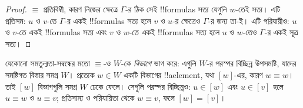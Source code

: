 \documentclass[../../../include/open-logic-section]{subfiles}
\begin{document}
\begin{proof}
  $\equiv$ প্রতিবিম্বী, কারণ নিজের ক্ষেত্রে $\Gamma$-র ঠিক সেই !!{formula}s সত্য যেগুলি $w$-তেই সত্য। এটি প্রতিসম: $u$ ও $v$-তে $\Gamma$-র একই !!{formula}s সত্য হলে $v$ ও $u$-র ক্ষেত্রেও $\Gamma$-র জন্য তা-ই। এটি পরিযায়ীও: $u$ ও $v$-তে একই !!{formula}s সত্য এবং $v$ ও $w$-তে একই !!{formula}s সত্য হলে $u$ ও $w$-তেও $\Gamma$-র একই সূত্র সত্য।
\end{proof}

যেকোনো সমতুল্যতা-সম্বন্ধের মতো $\equiv$-ও $W$-কে \emph{বিভাগে} ভাগ করে: এগুলি $W$-র পরস্পর বিচ্ছিন্ন উপসমষ্টি, যাদের সমষ্টিগত বিস্তার সমগ্র $W$। প্রত্যেক $w \in W$ একটি বিভাগের !!a{element}, যথা $[w]$-এর, কারণ $w \equiv w$। তাই $[w]$ বিভাগগুলি সমগ্র $W$ ঢেকে ফেলে। সেগুলি পরস্পর বিচ্ছিন্নও: $u \in [w]$ এবং $u \in [v]$ হলে $u \equiv w$ ও $u \equiv v$; প্রতিসাম্য ও পরিযায়িতা থেকে $w \equiv v$, ফলে $[w] = [v]$।
\end{document}
